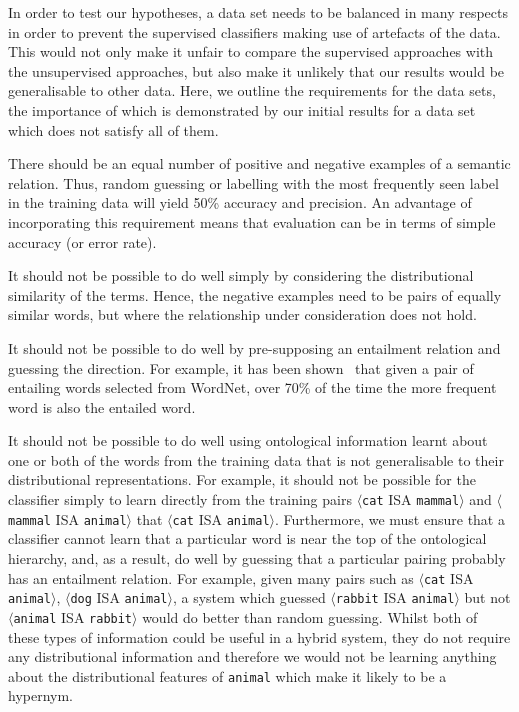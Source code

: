 \documentclass[11pt]{article}
\newcommand\pair[2]{$\langle$\texttt{#1} ISA \texttt{#2}$\rangle$}
\begin{document}
In order to test our hypotheses, a data set needs to be balanced in many respects in order to prevent the supervised classifiers making use of artefacts of the data.  This would not only make it unfair to compare the supervised approaches with the unsupervised approaches, but also make it unlikely that our results would be generalisable to other data.  Here, we outline the requirements for the data sets, the importance of which is demonstrated by our initial results for a data set which does not satisfy all of them.

There should be an equal number of positive and negative examples of a semantic relation.  Thus, random guessing or labelling with the most frequently seen label in the training data will yield 50\% accuracy and precision.  An advantage of incorporating this requirement means that evaluation can be in terms of simple accuracy (or error rate).

It should not be possible to do well simply by considering the distributional similarity of the terms.  Hence, the negative examples need to be pairs of equally similar words, but where the relationship under consideration does not hold.

It should not be possible to do well by pre-supposing an entailment relation and guessing the direction.  For example, it has been shown~\cite{Weeds2004} that given a pair of entailing words selected from WordNet, over 70\% of the time the more frequent word is also the entailed word.

It should not be possible to do well using ontological information learnt about one or both of the words from the training data that is not generalisable to their distributional representations.  For example, it should not be possible for the classifier simply to learn directly from the training pairs \pair{cat}{mammal} and \pair{mammal}{animal}  that \pair{cat}{animal}.  Furthermore, we must ensure that a classifier cannot learn that a particular word is near the top of the ontological hierarchy, and, as a result, do well by guessing that a particular pairing probably has an entailment relation.  For example, given many pairs such as \pair{cat}{animal}, \pair{dog}{animal}, a system which guessed \pair{rabbit}{animal} but not \pair{animal}{rabbit} would do better than random guessing.  Whilst both of these types of information could be useful in a hybrid system, they do not require any distributional information and therefore we would not be learning anything about the distributional features of \texttt{animal} which make it likely to be a hypernym.
\end{document}
